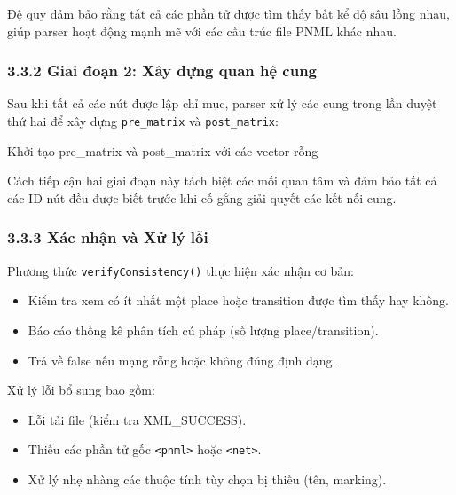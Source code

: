 \documentclass[12pt,a4paper]{article}
\begin{document}
Đệ quy đảm bảo rằng tất cả các phần tử được tìm thấy bất kể độ sâu lồng nhau, giúp parser hoạt động mạnh mẽ với các cấu trúc file PNML khác nhau.

\subsubsection*{3.3.2 Giai đoạn 2: Xây dựng quan hệ cung}

Sau khi tất cả các nút được lập chỉ mục, parser xử lý các cung trong lần duyệt thứ hai để xây dựng \texttt{pre\_matrix} và \texttt{post\_matrix}:

\begin{algorithm}[H]
\SetAlgoLined
\caption{Xây dựng Ma trận Cung}
Khởi tạo pre\_matrix và post\_matrix với các vector rỗng\;
\end{algorithm}

Cách tiếp cận hai giai đoạn này tách biệt các mối quan tâm và đảm bảo tất cả các ID nút đều được biết trước khi cố gắng giải quyết các kết nối cung.

\subsubsection*{3.3.3 Xác nhận và Xử lý lỗi}

Phương thức \texttt{verifyConsistency()} thực hiện xác nhận cơ bản:

\begin{itemize}
    \item Kiểm tra xem có ít nhất một place hoặc transition được tìm thấy hay không.
    \item Báo cáo thống kê phân tích cú pháp (số lượng place/transition).
    \item Trả về false nếu mạng rỗng hoặc không đúng định dạng.
\end{itemize}

Xử lý lỗi bổ sung bao gồm:
\begin{itemize}
    \item Lỗi tải file (kiểm tra XML\_SUCCESS).
    \item Thiếu các phần tử gốc \texttt{<pnml>} hoặc \texttt{<net>}.
    \item Xử lý nhẹ nhàng các thuộc tính tùy chọn bị thiếu (tên, marking).
\end{itemize}
\end{document}
